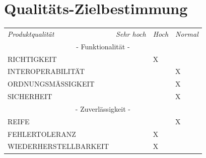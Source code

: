 \documentclass[a4paper]{scrreprt}
\begin{document}
    		
    		\newpage
    		
    		\section{Qualitäts-Zielbestimmung}
    		
    	\begin{table}[h!]
    		\centering
    		\begin{tabular}{llll}
    			\multicolumn{1}{l}{\textit{Produktqualität}}& \multicolumn{1}{c}{\textit{Sehr hoch}} & \multicolumn{1}{c}{\textit{Hoch}} & \multicolumn{1}{c}{\textit{Normal}}  \\
    			\multicolumn{4}{c}{- Funktionalität -} \\
    			RICHTIGKEIT                                  &                                        &    \hspace{6mm}               X               &                                      \\
    			INTEROPERABILITÄT                            &                                        &                                   &    \hspace{6mm}                     X               \\
    			ORDNUNGSMÄSSIGKEIT                           &                                        &                                   &    \hspace{6mm}                     X               \\
    			SICHERHEIT                                   &                                        &                                   &    \hspace{6mm}                     X               \\
    			\multicolumn{4}{c}{- Zuverlässigkeit -}\\
    			REIFE                                        &                                        &                                   &     \hspace{6mm}                    X               \\
    			FEHLERTOLERANZ                               &                                        &  \hspace{6mm}                    X               &                                      \\
    			WIEDERHERSTELLBARKEIT                        &                                        &   \hspace{6mm}                   X               &                                      \\

\end{tabular}
\end{table}
\end{document}
